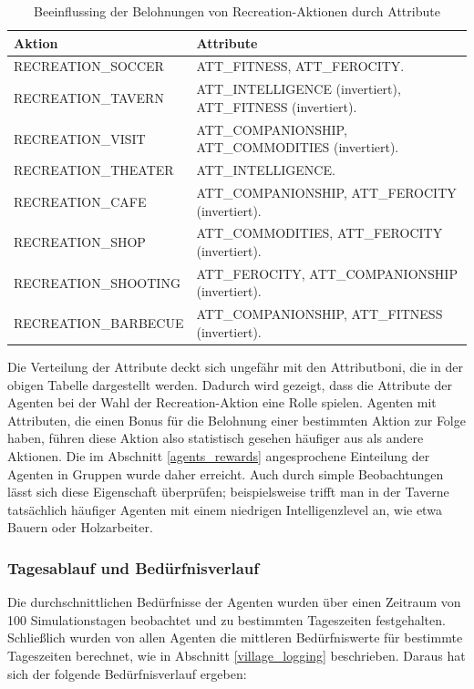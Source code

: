 \smallskip
\begin{table}[H]
\begin{tabular} {|  p{5cm}  |  p{10.6cm}  |} \hline
\textbf{Aktion} & \textbf{Attribute} \\ \hline
RECREATION\_SOCCER & ATT\_FITNESS, ATT\_FEROCITY. \\ \hline
RECREATION\_TAVERN & ATT\_INTELLIGENCE (invertiert), ATT\_FITNESS (invertiert). \\ \hline
RECREATION\_VISIT & ATT\_COMPANIONSHIP, ATT\_COMMODITIES (invertiert). \\ \hline
RECREATION\_THEATER & ATT\_INTELLIGENCE. \\ \hline
RECREATION\_CAFE & ATT\_COMPANIONSHIP, ATT\_FEROCITY (invertiert). \\ \hline
RECREATION\_SHOP & ATT\_COMMODITIES, ATT\_FEROCITY (invertiert). \\ \hline
RECREATION\_SHOOTING & ATT\_FEROCITY, ATT\_COMPANIONSHIP (invertiert). \\ \hline
RECREATION\_BARBECUE & ATT\_COMPANIONSHIP, ATT\_FITNESS (invertiert). \\ \hline

\end{tabular}
\caption{Beeinflussing der Belohnungen von Recreation-Aktionen durch Attribute}
\label{tab:recreation_actions_attributes}
\end{table}

Die Verteilung der Attribute deckt sich ungefähr mit den Attributboni, die in der obigen Tabelle dargestellt werden. Dadurch wird gezeigt, dass die Attribute der Agenten bei der Wahl der Recreation-Aktion eine Rolle spielen. Agenten mit Attributen, die einen Bonus für die Belohnung einer bestimmten Aktion zur Folge haben, führen diese Aktion also statistisch gesehen häufiger aus als andere Aktionen. Die im Abschnitt \ref{agents_rewards} angesprochene Einteilung der Agenten in Gruppen wurde daher erreicht. Auch durch simple Beobachtungen lässt sich diese Eigenschaft überprüfen; beispielsweise trifft man in der Taverne tatsächlich häufiger Agenten mit einem niedrigen Intelligenzlevel an, wie etwa Bauern oder Holzarbeiter.




\subsubsection{Tagesablauf und Bedürfnisverlauf}
Die durchschnittlichen Bedürfnisse der Agenten wurden über einen Zeitraum von 100 Simulationstagen beobachtet und zu bestimmten Tageszeiten festgehalten. Schließlich wurden von allen Agenten die mittleren Bedürfniswerte für bestimmte Tageszeiten berechnet, wie in Abschnitt \ref{village_logging} beschrieben. Daraus hat sich der folgende Bedürfnisverlauf ergeben:

